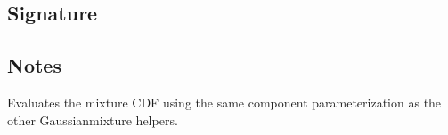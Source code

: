 \documentclass[letterpaper,10pt,english]{sphinxmanual}
\begin{document}
\subsection{Signature}
\label{\detokenize{api_reference:id31}}
\begin{sphinxVerbatim}[commandchars=\\\{\}]
\end{sphinxVerbatim}


\subsection{Notes}
\label{\detokenize{api_reference:id32}}
\sphinxAtStartPar
Evaluates the mixture CDF using the same component parameterization as the other Gaussian\sphinxhyphen{}mixture helpers.
\end{document}
